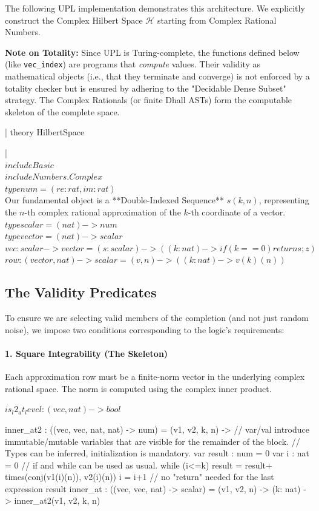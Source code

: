 \documentclass{stex}
\begin{document}
The following UPL implementation demonstrates this architecture. We explicitly construct the Complex Hilbert Space $\mathcal{H}$ starting from Complex Rational Numbers.

\textbf{Note on Totality:} Since UPL is Turing-complete, the functions defined below (like \texttt{vec\_index}) are programs that \textit{compute} values. Their validity as mathematical objects (i.e., that they terminate and converge) is not enforced by a totality checker but is ensured by adhering to the "Decidable Dense Subset" strategy. The Complex Rationals (or finite Dhall ASTs) form the computable skeleton of the complete space.
\begin{smodule}[id=Kopperman2]
\uplsetup
\uplinline|  theory HilbertSpace { | \\
\uplinline$    include Basic $\\
\uplinline$    include Numbers.Complex $\\
\uplinline$    type num = (re: rat, im: rat) $\\

Our fundamental object is a **Double-Indexed Sequence** $s(k, n)$, representing the $n$-th complex rational approximation of the $k$-th coordinate of a vector.
\uplinline$    type scalar = (nat) -> num$\\
\uplinline$    type vector = (nat) -> scalar$\\
\uplinline$    vec : scalar -> vector = (s:scalar) -> ((k: nat) -> {if(k==0) return s; z})$\\
\uplinline$    row: (vector, nat) -> scalar = (v, n) -> ((k: nat) -> v(k)(n))$


\subsection{The Validity Predicates}

To ensure we are selecting valid members of the completion (and not just random noise), we impose two conditions corresponding to the logic's requirements:

\paragraph{1. Square Integrability (The Skeleton)}
Each approximation row must be a finite-norm vector in the underlying complex rational space. The norm is computed using the complex inner product.



\uplinline$    is_l2_at_level : (vec, nat) -> bool$\\
\begin{upl}
   inner_at2 : ((vec, vec, nat, nat) -> num) = (v1, v2, k, n) -> {
    // var/val introduce immutable/mutable variables that are visible for the remainder of the block.
    // Types can be inferred, initialization is mandatory.
    var result : num = 0
    var i : nat = 0
    // if and while can be used as usual.
    while (i<=k) {
      result = result+ times(conj(v1(i)(n)), v2(i)(n))
      i = i+1
    }
    // no "return" needed for the last expression
    result
  }
  inner_at : ((vec, vec, nat) -> scalar) = (v1, v2, n) -> (k: nat) -> inner_at2(v1, v2, k, n)
\end{upl}

}
\end{smodule}
\end{document}
